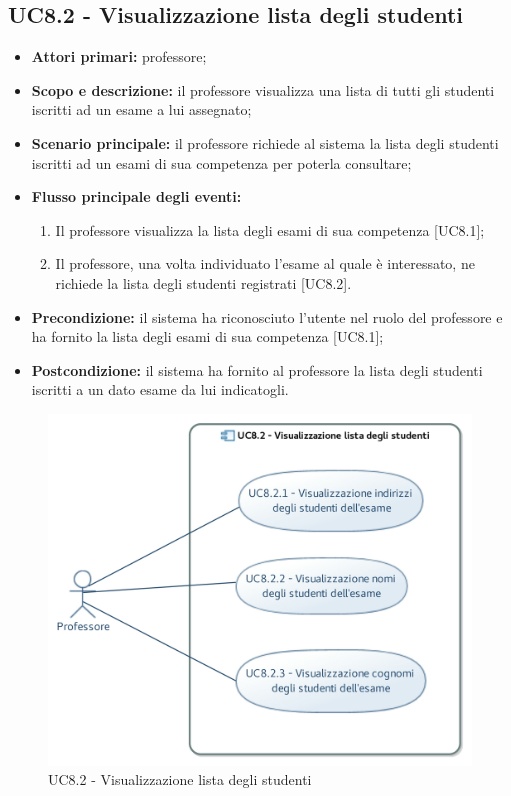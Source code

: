 \documentclass[AnalisiDeiRequisiti.tex]{subfiles}
\begin{document}
\subsection{UC8.2 - Visualizzazione lista degli studenti}
\begin{itemize}
	\item \textbf{Attori primari:} professore;
	\item \textbf{Scopo e descrizione:} il professore visualizza una lista di tutti gli studenti iscritti ad un esame a lui assegnato;
	\item \textbf{Scenario principale:} il professore richiede al sistema la lista degli studenti iscritti ad un esami di sua competenza per poterla consultare;
	\item \textbf{Flusso principale degli eventi:}
	\begin{enumerate}
		\item Il professore visualizza la lista degli esami di sua competenza [UC8.1];
		\item Il professore, una volta individuato l'esame al quale è interessato, ne richiede la lista degli studenti registrati [UC8.2].
	\end{enumerate}
	\item \textbf{Precondizione:} il sistema ha riconosciuto l'utente nel ruolo del professore e ha fornito la lista degli esami di sua competenza [UC8.1]; 
	\item \textbf{Postcondizione:} il sistema ha fornito al professore la lista degli studenti iscritti a un dato esame da lui indicatogli.
\end{itemize}
\begin{figure}[H]
	\centering
	\includegraphics[width=0.7\linewidth]{UC8_2.jpg}
	\caption{UC8.2 - Visualizzazione lista degli studenti}
	\label{UC8.2 - Visualizzazione lista degli studenti}
\end{figure}
\end{document}
